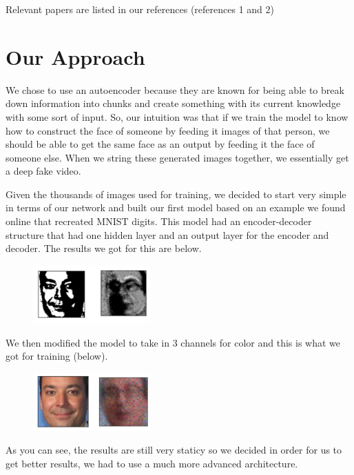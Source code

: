 \documentclass{article}
\begin{document}
Relevant papers are listed in our references (references 1 and 2) 

\section{Our Approach}
\label{headings}

We chose to use an autoencoder because they are known for being able to break down information into chunks and create something with its current knowledge with some sort of input. So, our intuition was that if we train the model to know how to construct the face of someone by feeding it images of that person, we should be able to get the same face as an output by feeding it the face of someone else. When we string these generated images together, we essentially get a deep fake video. 


Given the thousands of images used for training, we decided to start very simple in terms of our network and built our first model based on an example we found online that recreated MNIST digits. This model had an encoder-decoder structure that had one hidden layer and an output layer for the encoder and decoder. The results we got for this are below.

\begin{figure}[!htbp]
\centering
\includegraphics[width=0.4\textwidth]{sidebyside.png}
\end{figure}

We then modified the model to take in 3 channels for color and this is what we got for training (below).

\begin{figure}[!htbp]
\centering
\includegraphics[width=0.4\textwidth]{Sidebyside2.png}
\end{figure}

As you can see, the results are still very staticy so we decided in order for us to get better results, we had to use a much more advanced architecture. 
\end{document}
